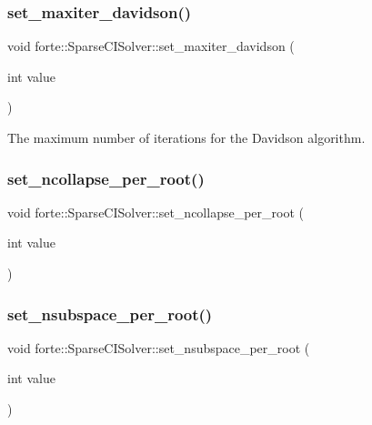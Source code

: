 \subsubsection{\texorpdfstring{set\+\_\+maxiter\+\_\+davidson()}{set\_maxiter\_davidson()}}
{\footnotesize\ttfamily void forte\+::\+Sparse\+C\+I\+Solver\+::set\+\_\+maxiter\+\_\+davidson (\begin{DoxyParamCaption}\item[{int}]{value }\end{DoxyParamCaption})}



The maximum number of iterations for the Davidson algorithm. 

\mbox{\label{classforte_1_1_sparse_c_i_solver_a98223e6d0c0f619f74fa1e2b2a0088b2}} 
\subsubsection{\texorpdfstring{set\+\_\+ncollapse\+\_\+per\+\_\+root()}{set\_ncollapse\_per\_root()}}
{\footnotesize\ttfamily void forte\+::\+Sparse\+C\+I\+Solver\+::set\+\_\+ncollapse\+\_\+per\+\_\+root (\begin{DoxyParamCaption}\item[{int}]{value }\end{DoxyParamCaption})}

\mbox{\label{classforte_1_1_sparse_c_i_solver_afb3b309aa3bca16bcfc5c19a32e15073}} 
\subsubsection{\texorpdfstring{set\+\_\+nsubspace\+\_\+per\+\_\+root()}{set\_nsubspace\_per\_root()}}
{\footnotesize\ttfamily void forte\+::\+Sparse\+C\+I\+Solver\+::set\+\_\+nsubspace\+\_\+per\+\_\+root (\begin{DoxyParamCaption}\item[{int}]{value }\end{DoxyParamCaption})}

